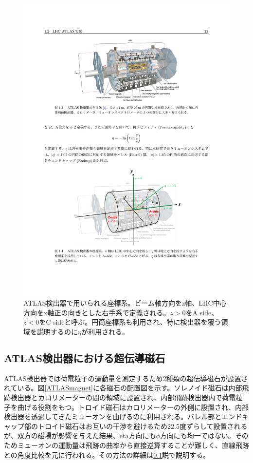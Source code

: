\begin{figure} 
\centering
\includegraphics[width=16cm]{fig/Intro/ATLAScordination.pdf}
\caption[ATLAS検出器における座標系]{ATLAS検出器で用いられる座標系。ビーム軸方向をz軸、LHC中心方向をx軸正の向きとした右手系で定義される。$z>0$をA side、$z<0$をC sideと呼ぶ。円筒座標系も利用され、特に検出器を覆う領域を説明するのに$\eta$が利用される。}
\label{ATLAScordination}
\end{figure}


\subsection{ATLAS検出器における超伝導磁石}
ATLAS検出器では荷電粒子の運動量を測定するため2種類の超伝導磁石が設置されている。図\ref{ATLASmagnet}に各磁石の配置図を示す。ソレノイド磁石は内部飛跡検出器とカロリメーターの間の領域に設置され、内部飛跡検出器内で荷電粒子を曲げる役割をもつ。トロイド磁石はカロリメーターの外側に設置され、内部検出器を透過してきたミューオンを曲げるのに利用される。バレル部とエンドキャップ部のトロイド磁石はお互いの干渉を避けるため22.5度ずらして設置されるが、双方の磁場が影響を与えた結果、eta方向にも$\phi$方向にも均一ではない。そのためミューオンの運動量は飛跡の曲率から直接逆算することが難しく、直線飛跡との角度比較を元に行われる。その方法の詳細は\ref{}説で説明する。


